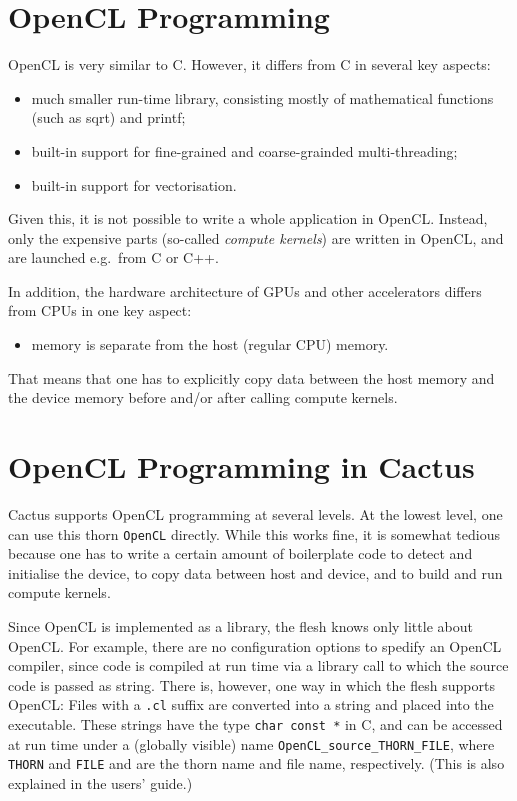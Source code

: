 \section{OpenCL Programming}

OpenCL is very similar to C\@. However, it differs from C in several
key aspects:
\begin{itemize}
\item much smaller run-time library, consisting mostly of mathematical
  functions (such as sqrt) and printf;
\item built-in support for fine-grained and coarse-grainded
  multi-threading;
\item built-in support for vectorisation.
\end{itemize}
Given this, it is not possible to write a whole application in
OpenCL\@. Instead, only the expensive parts (so-called \emph{compute
  kernels}) are written in OpenCL, and are launched e.g.\ from C or
C++.

In addition, the hardware architecture of GPUs and other accelerators
differs from CPUs in one key aspect:
\begin{itemize}
\item memory is separate from the host (regular CPU) memory.
\end{itemize}
That means that one has to explicitly copy data between the host
memory and the device memory before and/or after calling compute
kernels.



\section{OpenCL Programming in Cactus}

Cactus supports OpenCL programming at several levels. At the lowest
level, one can use this thorn \texttt{OpenCL} directly. While this
works fine, it is somewhat tedious because one has to write a certain
amount of boilerplate code to detect and initialise the device, to
copy data between host and device, and to build and run compute
kernels.

Since OpenCL is implemented as a library, the flesh knows only little
about OpenCL\@. For example, there are no configuration options to
spedify an OpenCL compiler, since code is compiled at run time via a
library call to which the source code is passed as string. There is,
however, one way in which the flesh supports OpenCL: Files with a
\texttt{.cl} suffix are converted into a string and placed into the
executable. These strings have the type \texttt{char~const~*} in C,
and can be accessed at run time under a (globally visible) name
\texttt{OpenCL\_source\_THORN\_FILE}, where \texttt{THORN} and
\texttt{FILE} and are the thorn name and file name, respectively.
(This is also explained in the users' guide.)



